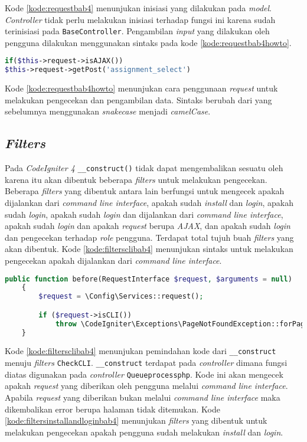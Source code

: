 Kode \ref{kode:requestbab4} menunjukan inisiasi yang dilakukan pada \textit{model}. \textit{Controller} tidak perlu melakukan inisiasi terhadap fungsi ini karena sudah terinisiasi pada \texttt{BaseController}. Pengambilan \textit{input} yang dilakukan oleh pengguna dilakukan menggunakan sintaks pada kode \ref{kode:requestbab4howto}.

\begin{lstlisting}[language=PHP, caption=Perancangan penggunaan \textit{request}, label=kode:requestbab4howto]
if($this->request->isAJAX())
$this->request->getPost('assignment_select')
\end{lstlisting}

Kode \ref{kode:requestbab4howto} menunjukan cara penggunaan \textit{request} untuk melakukan pengecekan dan pengambilan data. Sintaks berubah dari yang sebelumnya menggunakan \textit{snakecase} menjadi \textit{camelCase}.

\subsection{\textit{Filters}}
Pada \textit{CodeIgniter 4} \texttt{\_\_construct()} tidak dapat mengembalikan sesuatu oleh karena itu akan dibentuk beberapa \textit{filters} untuk melakukan pengecekan. Beberapa \textit{filters} yang dibentuk antara lain berfungsi untuk mengecek apakah dijalankan dari \textit{command line interface}, apakah sudah \textit{install} dan \textit{login}, apakah sudah \textit{login}, apakah sudah \textit{login} dan dijalankan dari \textit{command line interface}, apakah sudah \textit{login} dan apakah \textit{request} berupa \textit{AJAX}, dan apakah sudah \textit{login} dan pengecekan terhadap \textit{role} pengguna. Terdapat total tujuh buah \textit{filters} yang akan dibentuk. Kode \ref{kode:filtersclibab4} menunjukan sintaks untuk melakukan pengecekan apakah dijalankan dari \textit{command line interface}.

\begin{lstlisting}[language=PHP, caption=Perancangan kode pada \textit{Filters} \texttt{CheckCLI.php}, label=kode:filtersclibab4]
	public function before(RequestInterface $request, $arguments = null)
    {   
        $request = \Config\Services::request();

        if ($request->isCLI())
            throw \CodeIgniter\Exceptions\PageNotFoundException::forPageNotFound();
    }
\end{lstlisting}
Kode \ref{kode:filtersclibab4} menunjukan pemindahan kode dari \texttt{\_\_construct} menuju \textit{filters} \texttt{CheckCLI}.  \texttt{\_\_construct} terdapat pada \textit{controller} dimana fungsi diatas digunakan pada \textit{controller} \texttt{Queueprocessphp}. Kode ini akan mengecek apakah \textit{request} yang diberikan oleh pengguna melalui \textit{command line interface}. Apabila \textit{request} yang diberikan bukan melalui \textit{command line interface} maka dikembalikan error berupa halaman tidak ditemukan. Kode \ref{kode:filtersinstallandloginbab4} menunjukan \textit{filters} yang dibentuk untuk melakukan pengecekan apakah pengguna sudah melakukan \textit{install} dan \textit{login}.

